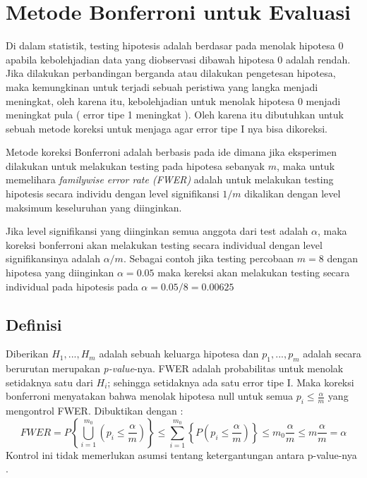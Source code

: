 \section{Metode Bonferroni untuk Evaluasi}

Di dalam statistik, testing hipotesis adalah berdasar pada menolak hipotesa 0 apabila kebolehjadian data yang diobservasi dibawah hipotesa 0 adalah rendah. Jika dilakukan perbandingan berganda atau dilakukan pengetesan hipotesa, maka kemungkinan untuk terjadi sebuah peristiwa yang langka menjadi meningkat, oleh karena itu, kebolehjadian untuk menolak hipotesa 0 menjadi meningkat pula ( error tipe 1 meningkat ). Oleh karena itu dibutuhkan untuk sebuah metode koreksi untuk menjaga agar error tipe I nya bisa dikoreksi.

Metode koreksi Bonferroni adalah berbasis pada ide dimana jika eksperimen dilakukan untuk melakukan testing pada hipotesa sebanyak $m$, maka untuk memelihara \textit{familywise error rate (FWER)} adalah untuk melakukan testing hipotesis secara individu dengan level signifikansi $1/m$ dikalikan dengan level maksimum keseluruhan yang diinginkan.

Jika level signifikansi yang diinginkan semua anggota dari test adalah $\alpha$, maka koreksi bonferroni akan melakukan testing secara individual dengan level signifikansinya adalah $\alpha/m$. Sebagai contoh jika testing percobaan $m=8$ dengan hipotesa yang diinginkan $\alpha =0.05$ maka kereksi akan melakukan testing secara individual pada hipotesis pada $\alpha =0.05/8=0.00625$ \citep{hochberg1988sharper}

\subsection{Definisi}
Diberikan $H_{{1}},...,H_{{m}}$ adalah sebuah keluarga hipotesa dan $p_{{1}},...,p_{{m}}$ adalah secara berurutan merupakan \textit{p-value}-nya. FWER adalah probabilitas untuk menolak setidaknya satu dari $H_{{i}}$; sehingga setidaknya ada satu error tipe I. Maka koreksi bonferroni menyatakan bahwa menolak hipotesa null untuk semua $p_{{i}}\leq {\frac  {\alpha }{m}}$ yang mengontrol FWER. Dibuktikan dengan :
\begin{equation}
FWER = P\left\{ \bigcup_{i=1}^{m_0}\left(p_{i}\leq\frac{\alpha}{m}\right)\right\} \leq\sum_{i=1}^{m_0}\left\{P\left(p_{i}\leq\frac{\alpha}{m}\right)\right\}\leq m_{0}\frac{\alpha}{m}\leq m\frac{\alpha}{m}=\alpha
\end{equation}
Kontrol ini tidak memerlukan asumsi tentang ketergantungan antara p-value-nya \citep{hochberg1988sharper}.